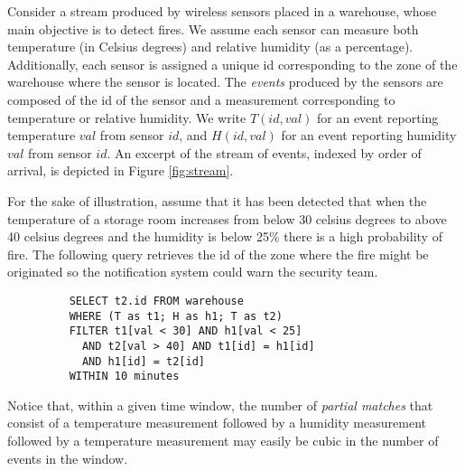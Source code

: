 
\begin{example}
Consider a stream produced by wireless sensors placed in a warehouse, whose main objective is to detect fires. We assume each sensor can measure both temperature (in Celsius degrees) and relative humidity (as a percentage). Additionally, each sensor is assigned a unique id corresponding to the zone of the warehouse where the sensor is located. The \emph{events} produced by the sensors are composed of the id of the sensor and a measurement corresponding to temperature or relative humidity. We write $T(id, val)$ for an event reporting temperature $val$ from sensor $id$, and $H(id, val)$ for an event reporting humidity $val$ from sensor $id$. An excerpt of the stream of events, indexed by order of arrival, is depicted in Figure \ref{fig:stream}.

\begin{figure}[h!]
\end{figure}

For the sake of illustration, assume that it has been detected that when the temperature of a storage room increases from below 30 celsius degrees to above 40 celsius degrees and the humidity is below 25\% there is a high probability of fire. The following query retrieves the id of the zone where the fire might be originated so the notification system could warn the security team.

\begin{figure}[H]
  \begin{verbatim}
    SELECT t2.id FROM warehouse
    WHERE (T as t1; H as h1; T as t2)
    FILTER t1[val < 30] AND h1[val < 25]
      AND t2[val > 40] AND t1[id] = h1[id]
      AND h1[id] = t2[id]
    WITHIN 10 minutes
  \end{verbatim}
\end{figure}

\vspace{-30pt}
Notice that, within a given time window, the number of \emph{partial matches} that consist of a temperature measurement followed by a humidity measurement followed by a temperature measurement may easily be cubic in the number of events in the window. 
\end{example}

